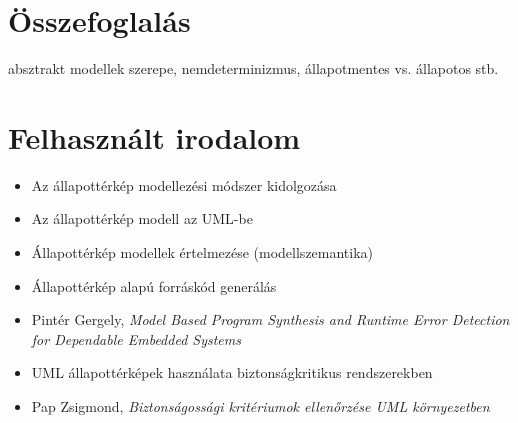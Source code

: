 \begin{landscape}
	\vspace*{\fill}
	\vspace*{\fill}
\end{landscape}



\section{Összefoglalás}

absztrakt modellek szerepe, nemdeterminizmus, állapotmentes vs. állapotos stb.

\section*{Felhasznált irodalom}

\begin{itemize}
	\item Az állapottérkép modellezési módszer kidolgozása~\cite{DBLP:journals/scp/Harel87, DBLP:conf/hopl/Harel07}
	\item Az állapottérkép modell az UML-be~\cite{UML}
	\item Állapottérkép modellek értelmezése (modellszemantika)~\cite{DBLP:conf/fmoods/LatellaMM99, DBLP:conf/acsd/DubrovinJ08, DBLP:conf/lics/HarelPSS87}
	\item Állapottérkép alapú forráskód generálás~\cite{samak2008practical}
	\item Pintér Gergely, \emph{Model Based Program Synthesis and Runtime Error Detection for Dependable Embedded Systems}~\cite{PinterGergelyPhD}
	\item UML állapottérképek használata biztonságkritikus rendszerekben~\cite{knight1997formal, DBLP:conf/icre/NobeW96}
	\item Pap Zsigmond, \emph{Biztonságossági kritériumok ellenőrzése UML környezetben}~\cite{PapZsigmondPhD}
\end{itemize}


